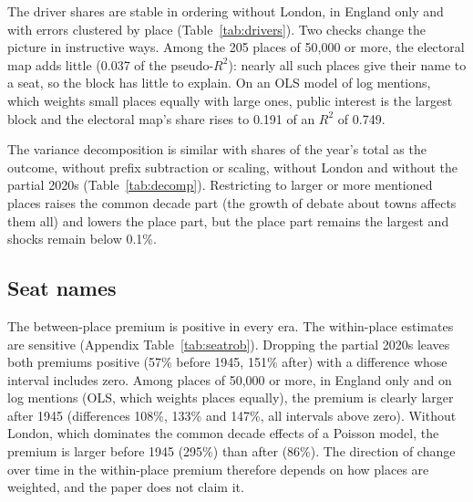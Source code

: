 \documentclass[11pt,a4paper]{article}
\begin{document}
The driver shares are stable in ordering without London, in England only and with errors clustered by place (Table~\ref{tab:drivers}). Two checks change the picture in instructive ways. Among the 205 places of 50,000 or more, the electoral map adds little (0.037 of the pseudo-$R^2$): nearly all such places give their name to a seat, so the block has little to explain. On an OLS model of log mentions, which weights small places equally with large ones, public interest is the largest block and the electoral map's share rises to 0.191 of an $R^2$ of 0.749.

The variance decomposition is similar with shares of the year's total as the outcome, without prefix subtraction or scaling, without London and without the partial 2020s (Table~\ref{tab:decomp}). Restricting to larger or more mentioned places raises the common decade part (the growth of debate about towns affects them all) and lowers the place part, but the place part remains the largest and shocks remain below 0.1\%.

\subsection{Seat names}
The between-place premium is positive in every era. The within-place estimates are sensitive (Appendix Table~\ref{tab:seatrob}). Dropping the partial 2020s leaves both premiums positive (57\% before 1945, 151\% after) with a difference whose interval includes zero. Among places of 50,000 or more, in England only and on log mentions (OLS, which weights places equally), the premium is clearly larger after 1945 (differences 108\%, 133\% and 147\%, all intervals above zero). Without London, which dominates the common decade effects of a Poisson model, the premium is larger before 1945 (295\%) than after (86\%). The direction of change over time in the within-place premium therefore depends on how places are weighted, and the paper does not claim it.
\end{document}
